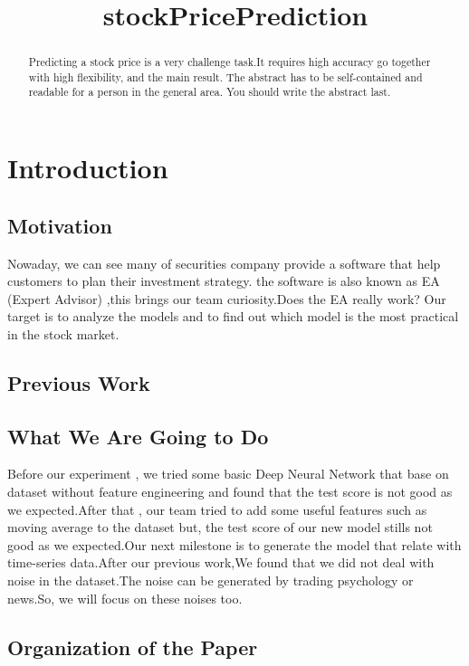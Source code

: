 \documentclass{article}
\title{stockPricePrediction}
\begin{document}
%
\maketitle
%
\begin{abstract}
Predicting a stock price is a very challenge task.It requires high accuracy go together with high flexibility, and the main result.  The abstract has to be
self-contained and readable for a person in the general area. You
should write the abstract last.
\end{abstract}

\section{Introduction}\label{sec:intro}

\subsection{Motivation}

Nowaday, we can see many of securities company provide a software that help customers to plan their investment strategy.
the software is also known as EA (Expert Advisor) ,this brings our team curiosity.Does the EA really work? Our target is to analyze the models and to find out which model is the most practical in the stock market.

\subsection{Previous Work}


\subsection{What We Are Going to Do}

Before our experiment , we tried some basic Deep Neural Network that base on dataset without feature engineering and found that the test score is not good as we expected.After that , our team tried to add some useful features such as moving average to the dataset but, the test score of our new model stills not good as we expected.Our next milestone is to generate the model that relate with time-series data.After our previous work,We found that we did not deal with noise in the dataset.The noise can be generated by trading psychology or news.So, we will focus on these noises too.

\subsection{Organization of the Paper}
\end{document}
